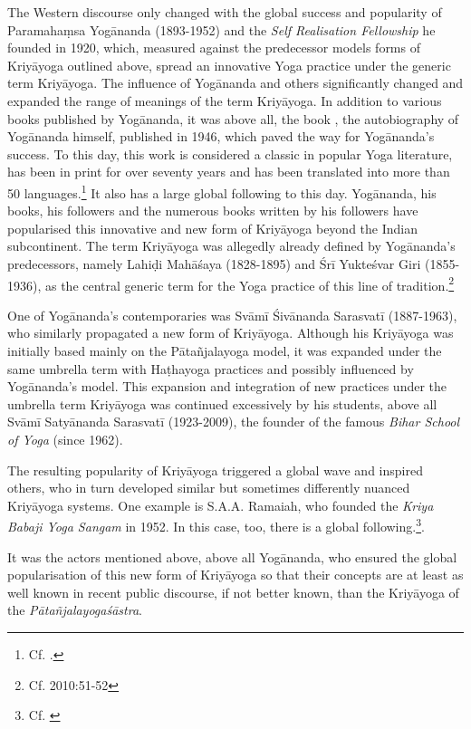 The Western discourse only changed with the global success and popularity of Paramahaṃsa Yogānanda (1893-1952) and the \textit{Self Realisation Fellowship} he founded in 1920, which, measured against the predecessor models forms of Kriyāyoga outlined above, spread an innovative Yoga practice under the generic term Kriyāyoga. The influence of Yogānanda and others significantly changed and expanded the range of meanings of the term Kriyāyoga. In addition to various books published by Yogānanda, it was above all, the book , the autobiography of Yogānanda himself, published in 1946, which paved the way for Yogānanda's success. To this day, this work is considered a classic in popular Yoga literature, has been in print for over seventy years and has been translated into more than 50 languages.\footnote{Cf. \cite{yoganandawebsite}.} It also has a large global following to this day. Yogānanda, his books, his followers and the numerous books written by his followers have popularised this innovative and new form of Kriyāyoga beyond the Indian subcontinent. The term Kriyāyoga was allegedly already defined by Yogānanda's predecessors, namely Lahiḍi Mahāśaya (1828-1895) and Śrī Yukteśvar Giri (1855-1936), as the central generic term for the Yoga practice of this line of tradition.\footnote{Cf. \citeauthor{govindan2010} 2010:51-52} 

One of Yogānanda's contemporaries was Svāmī Śivānanda Sarasvatī (1887-1963), who similarly propagated a new form of Kriyāyoga. Although his Kriyāyoga was initially based mainly on the Pātañjalayoga model, it was expanded under the same umbrella term with Haṭhayoga practices and possibly influenced by Yogānanda's model. This expansion and integration of new practices under the umbrella term Kriyāyoga was continued excessively by his students, above all Svāmī Satyānanda Sarasvatī (1923-2009), the founder of the famous \textit{Bihar School of Yoga} (since 1962).

The resulting popularity of Kriyāyoga triggered a global wave and inspired others, who in turn developed similar but sometimes differently nuanced Kriyāyoga systems. One example is S.A.A. Ramaiah, who founded the \textit{Kriya Babaji Yoga Sangam} in 1952. In this case, too, there is a global following.\footnote{Cf. \cite{kriyababajiyoga}}.

It was the actors mentioned above, above all Yogānanda, who ensured the global popularisation of this new form of Kriyāyoga so that their concepts are at least as well known in recent public discourse, if not better known, than the Kriyāyoga of the \textit{Pātañjalayogaśāstra}.

